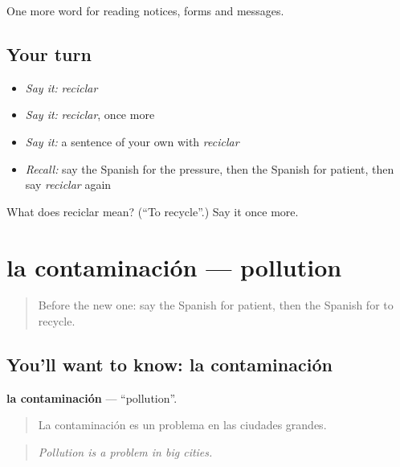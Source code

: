 \begin{grammarlens}[title={What you've built}]
One more word for reading notices, forms and messages.
\end{grammarlens}

\subsection*{Your turn}
\begin{itemize}
\raggedright
  \item \emph{Say it:} \emph{reciclar}
  \item \emph{Say it:} \emph{reciclar}, once more
  \item \emph{Say it:} a sentence of your own with \emph{reciclar}
  \item \emph{Recall:} say the Spanish for the pressure, then the Spanish for patient, then say \emph{reciclar} again
\end{itemize}

\begin{tcolorbox}[breakable,colback=teal!4,colframe=teal!35!black,title={Before you move on}]
What does reciclar mean? (\textquotedblleft{}To recycle\textquotedblright{}.) Say it once more.
\end{tcolorbox}
\section[la contaminación]{la contaminación — pollution}

\label{lesson:ES-C504-contaminacion}



\begin{quote}
Before the new one: say the Spanish for patient, then the Spanish for to recycle.
\end{quote}

\subsection*{You'll want to know: la contaminación}
\textbf{la contaminación} — \textquotedblleft{}pollution\textquotedblright{}.

\begin{quote}
La contaminación es un problema en las ciudades grandes.
\end{quote}

\begin{quote}
\emph{Pollution is a problem in big cities.}
\end{quote}

